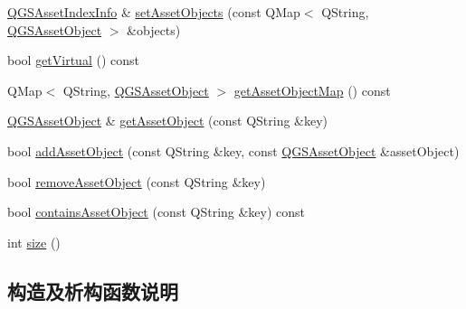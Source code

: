 \begin{DoxyCompactItemize}
\item 
\mbox{\hyperlink{class_q_g_s_asset_index_info}{Q\+G\+S\+Asset\+Index\+Info}} \& \mbox{\hyperlink{class_q_g_s_asset_index_info_abc46db2536a782ac4d9a124101ae0aee}{set\+Asset\+Objects}} (const Q\+Map$<$ Q\+String, \mbox{\hyperlink{class_q_g_s_asset_object}{Q\+G\+S\+Asset\+Object}} $>$ \&objects)
\item 
bool \mbox{\hyperlink{class_q_g_s_asset_index_info_a1024b5ef1f9bc44b2cced0beb7f78681}{get\+Virtual}} () const
\item 
Q\+Map$<$ Q\+String, \mbox{\hyperlink{class_q_g_s_asset_object}{Q\+G\+S\+Asset\+Object}} $>$ \mbox{\hyperlink{class_q_g_s_asset_index_info_a554c0c052b38792342b8286dc47d1108}{get\+Asset\+Object\+Map}} () const
\item 
\mbox{\hyperlink{class_q_g_s_asset_object}{Q\+G\+S\+Asset\+Object}} \& \mbox{\hyperlink{class_q_g_s_asset_index_info_ab8614a5ea67c6e88c6a314343b64cda7}{get\+Asset\+Object}} (const Q\+String \&key)
\item 
bool \mbox{\hyperlink{class_q_g_s_asset_index_info_a097bff90ca1ef05be0ce2697da922894}{add\+Asset\+Object}} (const Q\+String \&key, const \mbox{\hyperlink{class_q_g_s_asset_object}{Q\+G\+S\+Asset\+Object}} \&asset\+Object)
\item 
bool \mbox{\hyperlink{class_q_g_s_asset_index_info_a293cbaa056c8d9d3e8e2a56bb09b1608}{remove\+Asset\+Object}} (const Q\+String \&key)
\item 
bool \mbox{\hyperlink{class_q_g_s_asset_index_info_a67065d061e0706841b79e7b837fdb991}{contains\+Asset\+Object}} (const Q\+String \&key) const
\item 
int \mbox{\hyperlink{class_q_g_s_asset_index_info_a56e04f0b73d47448736a542c122ebbf7}{size}} ()
\end{DoxyCompactItemize}


\subsection{构造及析构函数说明}
\mbox{\label{class_q_g_s_asset_index_info_aca7f21cac633e8d04e5ae59e6b1ea275}} 
